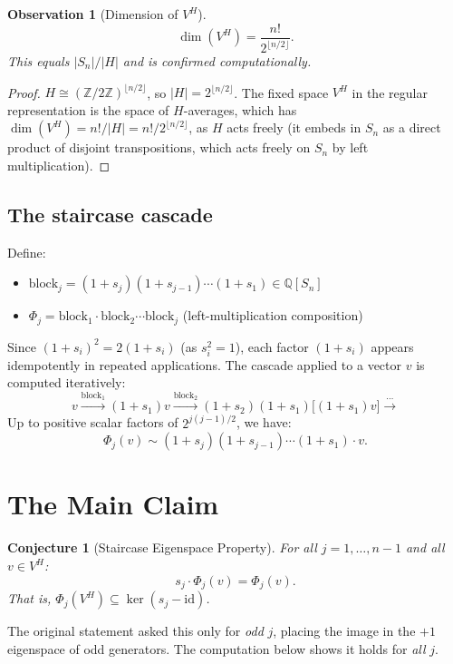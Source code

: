 \documentclass[12pt]{article}
\newtheorem{observation}[theorem]{Observation}
\newtheorem{conjecture}[theorem]{Conjecture}
\theoremstyle{definition}
\begin{document}
\begin{observation}[Dimension of $V^H$]
  \[
    \dim(V^H) = \frac{n!}{2^{\lfloor n/2 \rfloor}}.
  \]
  This equals $|S_n|/|H|$ and is confirmed computationally.
\end{observation}

\begin{proof}
  $H \cong (\mathbb{Z}/2\mathbb{Z})^{\lfloor n/2 \rfloor}$, so $|H| = 2^{\lfloor n/2 \rfloor}$.
  The fixed space $V^H$ in the regular representation is the space of $H$-averages, which has
  $\dim(V^H) = n!/|H| = n!/2^{\lfloor n/2 \rfloor}$, as $H$ acts freely (it embeds in $S_n$ as a
  direct product of disjoint transpositions, which acts freely on $S_n$ by left multiplication).
\end{proof}

\subsection{The staircase cascade}
Define:
\begin{itemize}
  \item $\text{block}_j = (1+s_j)(1+s_{j-1})\cdots(1+s_1) \in \mathbb{Q}[S_n]$
  \item $\Phi_j = \text{block}_1 \cdot \text{block}_2 \cdots \text{block}_j$ (left-multiplication composition)
\end{itemize}
Since $(1+s_i)^2 = 2(1+s_i)$ (as $s_i^2 = 1$), each factor $(1+s_i)$ appears idempotently in repeated applications. The cascade applied to a vector $v$ is computed iteratively:
\[
  v \xrightarrow{\text{block}_1} (1+s_1)v \xrightarrow{\text{block}_2} (1+s_2)(1+s_1)\bigl[(1+s_1)v\bigr] \xrightarrow{\cdots}
\]
Up to positive scalar factors of $2^{j(j-1)/2}$, we have:
\[
  \Phi_j(v) \sim (1+s_j)(1+s_{j-1})\cdots(1+s_1) \cdot v.
\]

\section{The Main Claim}

\begin{conjecture}[Staircase Eigenspace Property]
  For all $j = 1, \ldots, n-1$ and all $v \in V^H$:
  \[
    s_j \cdot \Phi_j(v) = \Phi_j(v).
  \]
  That is, $\Phi_j(V^H) \subseteq \ker(s_j - \mathrm{id})$.
\end{conjecture}

The original statement asked this only for \emph{odd} $j$, placing the image in the $+1$ eigenspace of odd generators. The computation below shows it holds for \emph{all} $j$.
\end{document}
